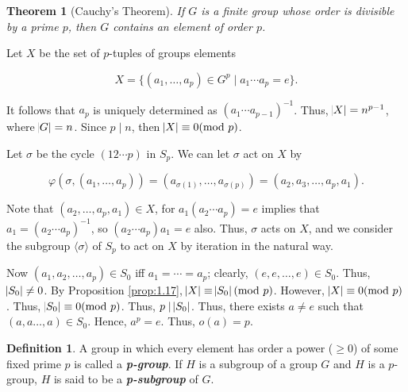 \documentclass{article}
\makeatletter
\newtheorem{theorem}{Theorem}[section]
\theoremstyle{definition}
\newtheorem{definition}{Definition}[section]
\theoremstyle{remark}
\let\oldproofname=\proofname
\renewcommand{\proofname}{\bf{\textit{\oldproofname}}}
\theoremstyle{definition}
\renewenvironment{proof}[1][\proofname]{\par
  \pushQED{\qed}%
  \normalfont \topsep6\p@\@plus6\p@\relax
  \list{}{\leftmargin=0mm
          \rightmargin=0mm
          \settowidth{\itemindent}{\itshape#1}%
          \labelwidth=4mm
          \parsep=0pt \listparindent=0mm%
  }
  \item[\hskip\labelsep
        \itshape
    #1\@addpunct{.}]\ignorespaces
}{%
  \popQED\endlist\@endpefalse
}
\makeatother
\begin{document}
    \begin{theorem}[Cauchy's Theorem]\label{thm:1.2}
        If $G$ is a finite group whose order is divisible by a prime $p$, then $G$ contains an element of order $p$.
    \end{theorem}
        \begin{proof}
            Let $X$ be the set of $p$-tuples of groups elements
            
            \begin{equation*}
                X=\{(a_1,\dots,a_p)\in G^p\mid a_1\cdots a_p=e\}.
            \end{equation*}
            
            It follows that $a_p$ is uniquely determined as $(a_1\cdots a_{p-1})^{-1}$. Thus, $\abs{X}=n^{p-1}$, where $\abs{G}=n$. Since $p\mid n$, then $\abs{X}\equiv 0(\text{mod }p)$.\par\hspace{4mm} Let $\sigma$ be the cycle $(12\cdots p)$ in $S_p$. We can let $\sigma$ act on $X$ by 
            
            \begin{equation*}
                \varphi(\sigma,(a_1,\dots,a_p))=(a_{\sigma(1)},\dots,a_{\sigma(p)})=(a_2,a_3,\dots,a_p,a_1).
            \end{equation*}
            
            Note that $(a_2,\dots,a_p,a_1)\in X$, for $a_1(a_2\cdots a_p)=e$ implies that $a_1=(a_2\cdots a_p)^{-1}$, so $(a_2\cdots a_p)a_1=e$ also. Thus, $\sigma$ acts on $X$, and we consider the subgroup $\langle\sigma\rangle$ of $S_p$ to act on $X$ by iteration in the natural way.\par\hspace{4mm} Now $(a_1,a_2,\dots,a_p)\in S_0$ iff $a_1=\cdots=a_p$; clearly, $(e,e,\dots,e)\in S_0$. Thus, $\abs{S_0}\neq 0$. By Proposition \ref{prop:1.17}, $\abs{X}\equiv\abs{S_0}(\text{mod }p)$. However, $\abs{X}\equiv 0(\text{mod }p)$. Thus, $\abs{S_0}\equiv 0(\text{mod }p)$. Thus, $p\mid\abs{S_0}$. Thus, there exists $a\neq e$ such that $(a,a\dots,a)\in S_0$. Hence, $a^p=e$. Thus, $o(a)=p$.
        \end{proof}
        
    \newpage
    
    \begin{definition}\label{df:1.6}
        A group in which every element has order a power ($\geq 0$) of some fixed prime $p$ is called a \textbf{\textit{p-group}}. If $H$ is a subgroup of a group $G$ and $H$ is a $p$-group, $H$ is said to be a \textbf{\textit{p-subgroup}} of $G$.
    \end{definition}
        
\end{document}
